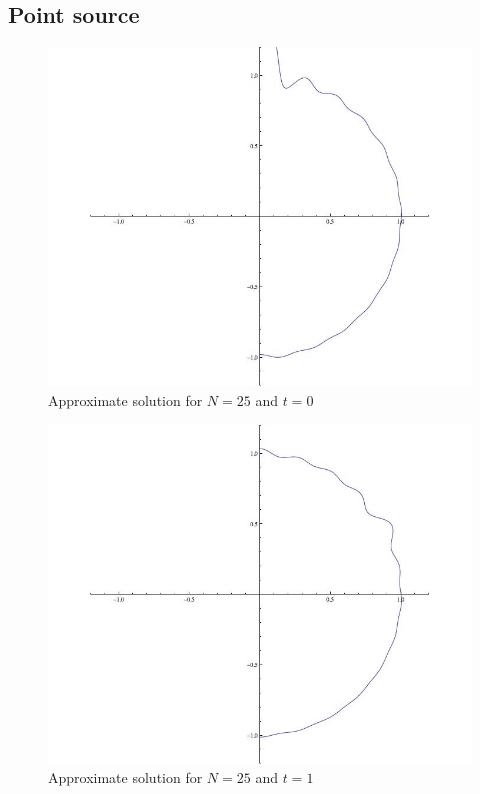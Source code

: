 \subsection{Point source}
\begin{figure}
\begin{center}
\includegraphics[width=\hsize]{../common/graphics/tsunami0}
\end{center}
\caption{Approximate solution for $N=25$ and $t=0$\label{tsunami0}}
\end{figure}
\begin{figure}
\begin{center}
\includegraphics[width=\hsize]{../common/graphics/tsunami50}
\end{center}
\caption{Approximate solution for $N=25$ and $t=1$\label{tsunami50}}
\end{figure}
